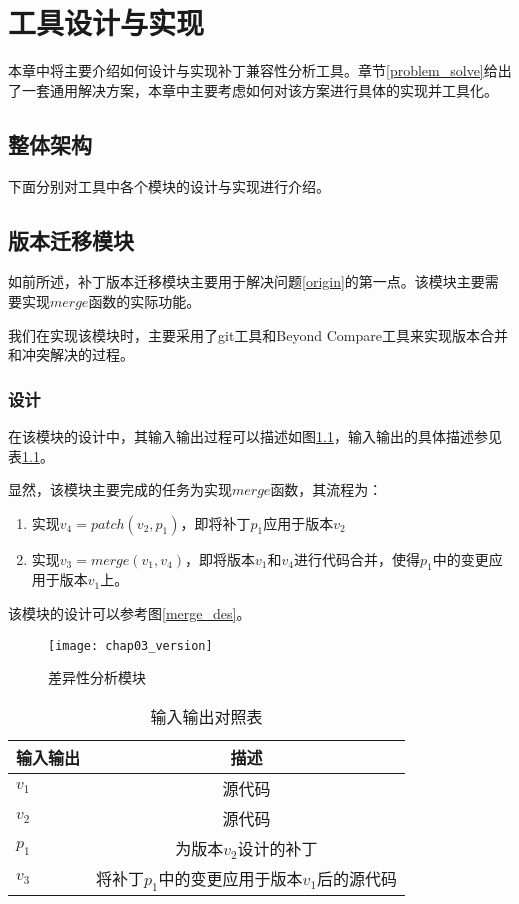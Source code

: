\chapter{工具设计与实现}
本章中将主要介绍如何设计与实现补丁兼容性分析工具。章节\ref {problem_solve}给出了一套通用解决方案，本章中主要考虑如何对该方案进行具体的实现并工具化。

\section{整体架构}
\label {tool_struct}

下面分别对工具中各个模块的设计与实现进行介绍。

\section{版本迁移模块}
\label {tool_patch}

如前所述，补丁版本迁移模块主要用于解决问题\ref {origin}的第一点。该模块主要需要实现$merge$函数的实际功能。

我们在实现该模块时，主要采用了git工具和Beyond Compare工具来实现版本合并和冲突解决的过程。

\subsection{设计}

在该模块的设计中，其输入输出过程可以描述如图\ref {version}，输入输出的具体描述参见表\ref {version_io}。

显然，该模块主要完成的任务为实现$merge$函数，其流程为：
\begin{enumerate}
	\item 实现$v_4 = patch(v_2,p_1)$，即将补丁$p_1$应用于版本$v_2$
	\item 实现$v_3 = merge(v_1,v_4)$，即将版本$v_1$和$v_4$进行代码合并，使得$p_1$中的变更应用于版本$v_1$上。
\end{enumerate}

该模块的设计可以参考图\ref {merge_des}。

\begin{figure}[H]
	\centering
	\texttt{[image: chap03\_version]}
	\caption {差异性分析模块}
	\label {version}	
\end{figure}

\begin{table}[H]
	\caption{输入输出对照表}
	\label{version_io}
	\centering
	\begin{tabular}{lc}
		\toprule[1.5pt]
		{\heiti 输入输出} & {\heiti 描述}\\\midrule[1pt]
		$v_1$ & 源代码 \\
		$v_2$ & 源代码 \\
		$p_1$ & 为版本$v_2$设计的补丁 \\
		$v_3$ & 将补丁$p_1$中的变更应用于版本$v_1$后的源代码 \\
		\bottomrule[1.5pt]
	\end{tabular}
\end{table}

